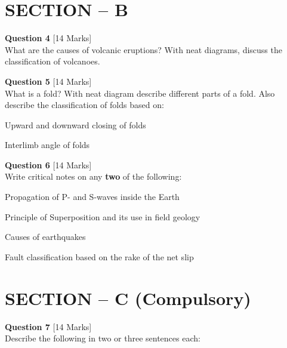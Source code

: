 \documentclass[11pt,a4paper]{article}
\begin{document}
\bigskip
\section*{SECTION -- B}




\noindent   \textbf{Question 4} \hfill [14 Marks]\\
What are the causes of volcanic eruptions? With neat diagrams, discuss the classification of volcanoes.

\bigskip




\noindent   \textbf{Question 5} \hfill [14 Marks]\\
What is a fold? With neat diagram describe different parts of a fold. Also describe the classification of folds based on:

\begin{parts}
  \item Upward and downward closing of folds
  \item Interlimb angle of folds
\end{parts}

\bigskip




\noindent   \textbf{Question 6} \hfill [14 Marks]\\
Write critical notes on any   \textbf{two} of the following:

\begin{parts}
  \item Propagation of P- and S-waves inside the Earth
  \item Principle of Superposition and its use in field geology
  \item Causes of earthquakes
  \item Fault classification based on the rake of the net slip
\end{parts}

\bigskip
\section*{SECTION -- C (Compulsory)}




\noindent   \textbf{Question 7} \hfill [14 Marks]\\
Describe the following in two or three sentences each:
\end{document}
